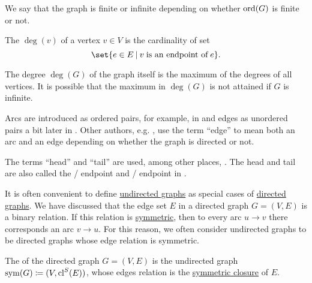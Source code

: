 \begin{definition}
\begin{thmenum}[resume=def:graph]
    We say that the graph is finite or infinite depending on whether \( \operatorname{ord}(G) \) is finite or not.

     The  \( \deg(v) \) of a vertex \( v \in V \) is the cardinality of set
    \begin{equation*}
      \set{ e \in E \given v \T{is an endpoint of} e }.
    \end{equation*}

    The degree \( \deg(G) \) of the graph itself is the maximum of the degrees of all vertices. It is possible that the maximum in \( \deg(G) \) is not attained if \( G \) is infinite.
  \end{thmenum}
\end{definition}

\begin{remark}\label{rem:endpoint_etymology}
  Arcs are introduced as ordered pairs, for example, in \cite[ch. 1, sec. 1.1]{GondranMinoux1984Graphs} and edges as unordered pairs a bit later in \cite[ch. 1, sec. 1.3]{GondranMinoux1984Graphs}. Other authors, e.g. \cite[sec. 5.2]{Erickson2019}, use the term \enquote{edge} to mean both an arc and an edge depending on whether the graph is directed or not.

  The terms \enquote{head} and \enquote{tail} are used, among other places, \cite[sec. 5.2]{Erickson2019}. The head and tail are also called the / endpoint and / endpoint in \cite[ch. 1, sec. 1.1]{GondranMinoux1984Graphs}.
\end{remark}

\begin{remark}\label{rem:undirected_graphs_as_directed}
  It is often convenient to define \hyperref[def:graph/directed]{undirected graphs} as special cases of \hyperref[def:graph/directed]{directed graphs}. We have discussed that the edge set \( E \) in a directed graph \( G = (V, E) \) is a binary relation. If this relation is \hyperref[def:binary_relation/symmetric]{symmetric}, then to every arc \( u \to v \) there corresponds an arc \( v \to u \). For this reason, we often consider undirected graphs to be directed graphs whose edge relation is symmetric.

  The  of the directed graph \( G = (V, E) \) is the undirected graph \( \operatorname{sym}(G) \coloneqq (V, \operatorname{cl}^S(E)) \), whose edges relation is the \hyperref[def:relation_closures/symmetric]{symmetric closure} of \( E \).
\end{remark}

